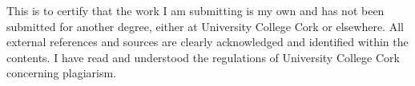 This is to certify that the work I am submitting is my own and has not been
submitted for another degree, either at University College Cork or elsewhere. All
external references and sources are clearly acknowledged and identified within the
contents. I have read and understood the regulations of University College Cork
concerning plagiarism.